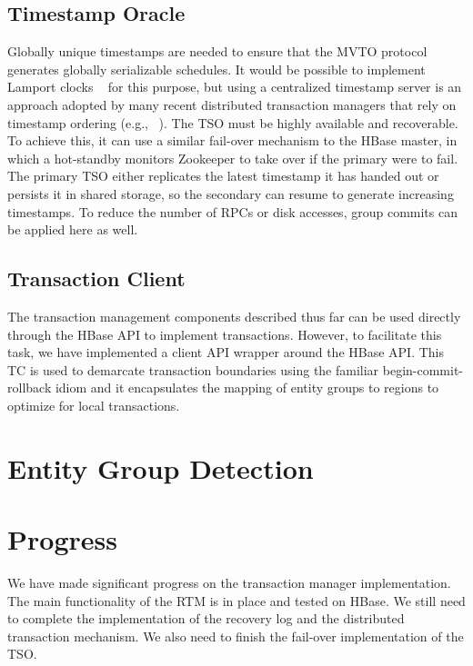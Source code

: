 \documentclass[10pt,final,journal]{IEEEtran}
\begin{document}
\subsection{Timestamp Oracle}
Globally unique timestamps are needed to ensure that the MVTO protocol generates globally serializable schedules. It would be possible to implement Lamport clocks ~\cite{Lamport:1978:TCO:359545.359563} for this purpose, but using a centralized timestamp server is an approach adopted by many recent distributed transaction managers that rely on timestamp ordering (e.g., ~\cite{Peng:2010:LIP:1924943.1924961, Wei:2011:5740834}). The TSO must be highly available and recoverable. To achieve this, it can use a similar fail-over mechanism to the HBase master, in which a hot-standby monitors Zookeeper to take over if the primary were to fail. The primary TSO either replicates the latest timestamp it has handed out or persists it in shared storage, so the secondary can resume to generate increasing timestamps. To reduce the number of RPCs or disk accesses, group commits can be applied here as well.

\subsection{Transaction Client}
The transaction management components described thus far can be used directly through the HBase API to implement transactions. However, to facilitate this task, we have implemented a client API wrapper around the HBase API. This TC is used to demarcate transaction boundaries using the familiar begin-commit-rollback idiom and it encapsulates the mapping of entity groups to regions to optimize for local transactions.



\section{Entity Group Detection}


\section{Progress}
We have made significant progress on the transaction manager implementation. The main functionality of the RTM is in place and tested on HBase. We still need to complete the implementation of the recovery log and the distributed transaction mechanism. We also need to finish the fail-over implementation of the TSO. 
\end{document}
